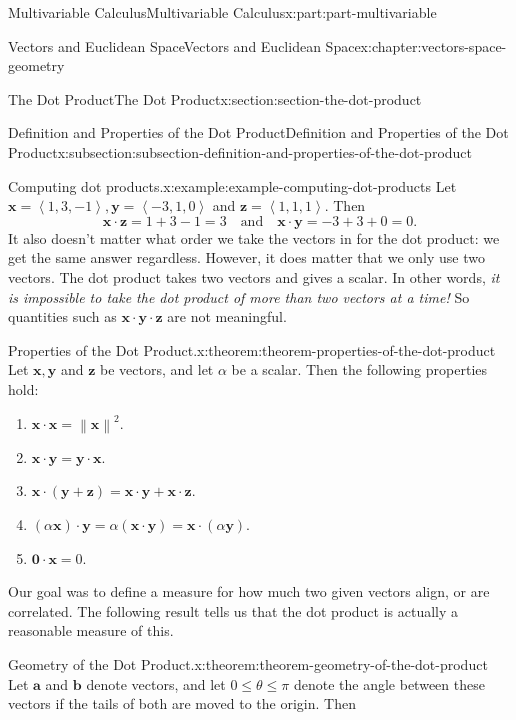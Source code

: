 \documentclass[twoside,10pt,]{book}
\numberwithin{equation}{part}
\newcommand{\norm}[1]{\left\| #1 \right\|}
\newcommand{\dotprod}[1]{\left\langle #1 \right\rangle}
\begin{document}
\begin{partptx}{Multivariable Calculus}{}{Multivariable Calculus}{}{}{x:part:part-multivariable}
\begin{chapterptx}{Vectors and Euclidean Space}{}{Vectors and Euclidean Space}{}{}{x:chapter:vectors-space-geometry}
\begin{sectionptx}{The Dot Product}{}{The Dot Product}{}{}{x:section:section-the-dot-product}
\begin{subsectionptx}{Definition and Properties of the Dot Product}{}{Definition and Properties of the Dot Product}{}{}{x:subsection:subsection-definition-and-properties-of-the-dot-product}
\begin{example}{Computing dot products.}{x:example:example-computing-dot-products}%
Let \(\mathbf{x} = \dotprod{1,3,-1},\mathbf{y} = \dotprod{-3,1,0}\) and \(\mathbf{z} = \dotprod{1,1,1}\). Then%
%
\begin{equation*}
\mathbf{x}\cdot\mathbf{z} = 1+3-1 = 3\quad\text{and}\quad\mathbf{x}\cdot\mathbf{y} = -3+3+0 = 0.
\end{equation*}
It also doesn't matter what order we take the vectors in for the dot product: we get the same answer regardless. However, it does matter that we only use two vectors. The dot product takes two vectors and gives a scalar. In other words, \emph{it is impossible to take the dot product of more than two vectors at a time!} So quantities such as \(\mathbf{x}\cdot\mathbf{y}\cdot\mathbf{z}\) are not meaningful.%
\end{example}
\begin{theorem}{Properties of the Dot Product.}{}{x:theorem:theorem-properties-of-the-dot-product}%
%
Let \(\mathbf{x},\mathbf{y}\) and \(\mathbf{z}\) be vectors, and let \(\alpha\) be a scalar. Then the following properties hold:%
%
\begin{multicols}{2}
\begin{enumerate}
\item{}\(\displaystyle \mathbf{x}\cdot\mathbf{x} = \norm{\mathbf{x}}^{2}.\)%
\item{}\(\displaystyle \mathbf{x}\cdot\mathbf{y} = \mathbf{y}\cdot\mathbf{x}.\)%
\item{}\(\displaystyle \mathbf{x}\cdot(\mathbf{y}+\mathbf{z}) = \mathbf{x}\cdot\mathbf{y}+\mathbf{x}\cdot\mathbf{z}.\)%
\item{}\(\displaystyle (\alpha\mathbf{x})\cdot\mathbf{y} = \alpha(\mathbf{x}\cdot\mathbf{y}) = \mathbf{x}\cdot(\alpha\mathbf{y}).\)%
\item{}\(\displaystyle \mathbf{0}\cdot\mathbf{x} = 0.\)%
\end{enumerate}
\end{multicols}
\end{theorem}
Our goal was to define a measure for how much two given vectors align, or are correlated. The following result tells us that the dot product is actually a reasonable measure of this.%
\begin{theorem}{Geometry of the Dot Product.}{}{x:theorem:theorem-geometry-of-the-dot-product}%
%
Let \(\mathbf{a}\) and \(\mathbf{b}\) denote vectors, and let \(0\leq\theta\leq\pi\) denote the angle between these vectors if the tails of both are moved to the origin. Then%

\end{theorem}
\end{subsectionptx}
\end{sectionptx}
\end{chapterptx}
\end{partptx}
\end{document}
